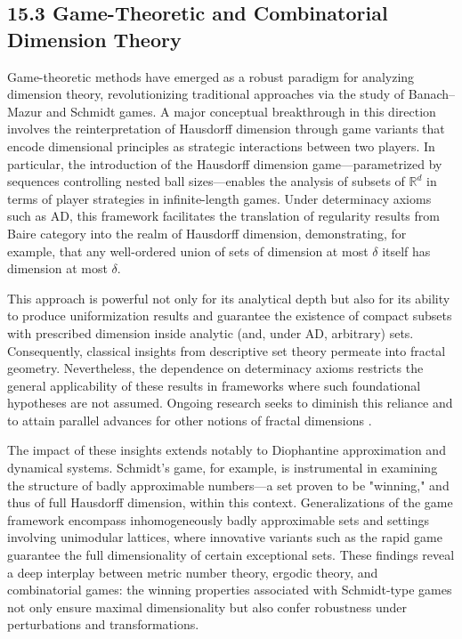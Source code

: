 \documentclass[11pt]{article}
\begin{document}
\subsection{15.3 Game-Theoretic and Combinatorial Dimension Theory}

Game-theoretic methods have emerged as a robust paradigm for analyzing dimension theory, revolutionizing traditional approaches via the study of Banach–Mazur and Schmidt games. A major conceptual breakthrough in this direction involves the reinterpretation of Hausdorff dimension through game variants that encode dimensional principles as strategic interactions between two players. In particular, the introduction of the Hausdorff dimension game—parametrized by sequences controlling nested ball sizes—enables the analysis of subsets of $\mathbb{R}^d$ in terms of player strategies in infinite-length games. Under determinacy axioms such as AD, this framework facilitates the translation of regularity results from Baire category into the realm of Hausdorff dimension, demonstrating, for example, that any well-ordered union of sets of dimension at most $\delta$ itself has dimension at most $\delta$. 

This approach is powerful not only for its analytical depth but also for its ability to produce uniformization results and guarantee the existence of compact subsets with prescribed dimension inside analytic (and, under AD, arbitrary) sets. Consequently, classical insights from descriptive set theory permeate into fractal geometry. Nevertheless, the dependence on determinacy axioms restricts the general applicability of these results in frameworks where such foundational hypotheses are not assumed. Ongoing research seeks to diminish this reliance and to attain parallel advances for other notions of fractal dimensions \cite{ref77}.

The impact of these insights extends notably to Diophantine approximation and dynamical systems. Schmidt's game, for example, is instrumental in examining the structure of badly approximable numbers—a set proven to be "winning," and thus of full Hausdorff dimension, within this context. Generalizations of the game framework encompass inhomogeneously badly approximable sets and settings involving unimodular lattices, where innovative variants such as the rapid game guarantee the full dimensionality of certain exceptional sets. These findings reveal a deep interplay between metric number theory, ergodic theory, and combinatorial games: the winning properties associated with Schmidt-type games not only ensure maximal dimensionality but also confer robustness under perturbations and transformations. 
\end{document}
